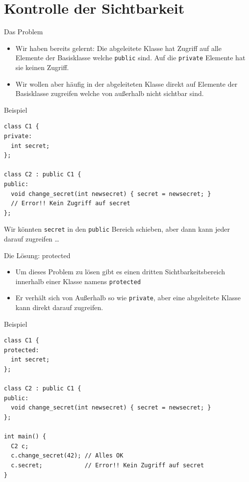 \documentclass[presentation]{beamer}
\begin{document}
\section{Kontrolle der Sichtbarkeit}
\label{sec:orgdd3ead4}
\begin{frame}[fragile,label={sec:orge3d7d30}]{Das Problem}
 \begin{itemize}
\item Wir haben bereits gelernt: Die abgeleitete Klasse hat Zugriff auf
alle Elemente der Basisklasse welche {\color{solarizedYellow}\texttt{public} }sind. Auf die
{\color{solarizedYellow}\texttt{private} }Elemente hat sie \alert{keinen} Zugriff.
\item Wir wollen aber häufig in der abgeleiteten Klasse direkt auf
Elemente der Basisklasse zugreifen welche von außerhalb nicht
sichtbar sind.
\end{itemize}
\begin{exampleblock}{Beispiel}
\begin{verbatim}
class C1 {
private:
  int secret;
};

class C2 : public C1 {
public:
  void change_secret(int newsecret) { secret = newsecret; }
  // Error!! Kein Zugriff auf secret
};
\end{verbatim}
Wir könnten {\color{solarizedYellow}\texttt{secret} }in den {\color{solarizedYellow}\texttt{public} }Bereich schieben, aber dann kann
jeder darauf zugreifen \ldots{}
\end{exampleblock}
\end{frame}
\begin{frame}[fragile,label={sec:org83f4000}]{Die Lösung: protected}
 \begin{itemize}
\item Um dieses Problem zu lösen gibt es einen dritten
Sichtbarkeitsbereich innerhalb einer Klasse namens {\color{solarizedYellow}\texttt{protected}}
\item Er verhält sich von Außerhalb so wie {\color{solarizedYellow}\texttt{private}}, aber eine
abgeleitete Klasse kann direkt darauf zugreifen.
\end{itemize}
\begin{exampleblock}{Beispiel}
\begin{verbatim}
class C1 {
protected:
  int secret;
};

class C2 : public C1 {
public:
  void change_secret(int newsecret) { secret = newsecret; }
};

int main() {
  C2 c;
  c.change_secret(42); // Alles OK
  c.secret;            // Error!! Kein Zugriff auf secret
}

\end{verbatim}
\end{exampleblock}
\end{frame}
\end{document}
